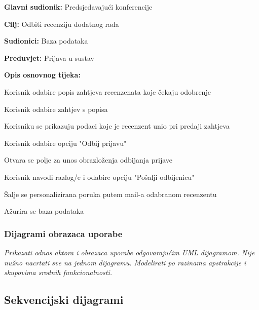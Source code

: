 					\noindent {}
					\begin{packed_item}
	
						\item \textbf{Glavni sudionik: } Predsjedavajući konferencije
						\item  \textbf{Cilj:} Odbiti recenziju dodatnog rada
						\item  \textbf{Sudionici:} Baza podataka
						\item  \textbf{Preduvjet:} Prijava u sustav
						\item  \textbf{Opis osnovnog tijeka:}
						
						\item[] \begin{packed_enum}
	
							\item Korisnik odabire popis zahtjeva recenzenata koje čekaju odobrenje
							\item Korisnik odabire zahtjev s popisa
							\item Korisniku se prikazuju podaci koje je recenzent unio pri predaji zahtjeva
							\item Korisnik odabire opciju "Odbij prijavu"
							\item Otvara se polje za unos obrazloženja odbijanja prijave
							\item Korisnik navodi razlog/e i odabire opciju "Pošalji odbijenicu"
							\item Šalje se personalizirana poruka putem mail-a odabranom recenzentu
							\item Ažurira se baza podataka

					
						\end{packed_enum}
			
					\end{packed_item}
					
					
				
					
				\subsubsection{Dijagrami obrazaca uporabe}
					
					\textit{Prikazati odnos aktora i obrazaca uporabe odgovarajućim UML dijagramom. Nije nužno nacrtati sve na jednom dijagramu. Modelirati po razinama apstrakcije i skupovima srodnih funkcionalnosti.}
				\eject		
				
			\subsection{Sekvencijski dijagrami}
				

